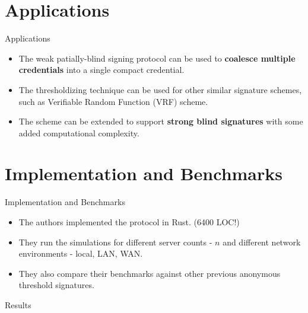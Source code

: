 \documentclass[
	xcolor={svgnames},
	hyperref={pagebackref,bookmarks},
	aspectratio=43,
]{beamer}
\begin{document}
\section{Applications}
\begin{frame}{Applications}
	\begin{itemize}
		\item The weak patially-blind signing protocol can be used to \textbf{coalesce multiple credentials} into a single compact credential.
		\item The thresholdizing technique can be used for other similar signature schemes, such as Verifiable Random Function (VRF) scheme.
		\item The scheme can be extended to support \textbf{strong blind signatures} with some added computational complexity. 
	\end{itemize}
\end{frame}

\section{Implementation and Benchmarks}
\begin{frame}{Implementation and Benchmarks}
	\begin{itemize}
		\item The authors implemented the protocol in Rust. (6400 LOC!)
		\item They run the simulations for different server counts - $n$ and different network environments - local, LAN, WAN.
		\item They also compare their benchmarks against other previous anonymous threshold signatures.
	\end{itemize}
\end{frame}

\begin{frame}{Results}
	\begin{figure}%
		\centering
		\qquad
		\label{fig:example}%
	\end{figure}
\end{frame}
\end{document}
